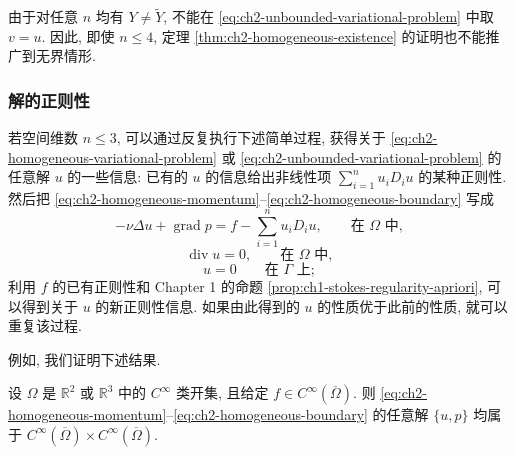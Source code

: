 \begin{Remark}
\label{rem:ch2-unbounded-test-space}
由于对任意 $n$ 均有 $Y\neq\widetilde Y$, 不能在 \eqref{eq:ch2-unbounded-variational-problem} 中取 $v=u$. 因此, 即使 $n\leq4$, 定理 \ref{thm:ch2-homogeneous-existence} 的证明也不能推广到无界情形.
\end{Remark}

\subsubsection*{解的正则性}

若空间维数 $n\leq3$, 可以通过反复执行下述简单过程, 获得关于 \eqref{eq:ch2-homogeneous-variational-problem} 或 \eqref{eq:ch2-unbounded-variational-problem} 的任意解 $u$ 的一些信息: 已有的 $u$ 的信息给出非线性项 $\sum_{i=1}^n u_iD_i u$ 的某种正则性. 然后把 \eqref{eq:ch2-homogeneous-momentum}--\eqref{eq:ch2-homogeneous-boundary} 写成
\begin{equation}
-\nu\Delta u+\operatorname{grad}p
=f-\sum_{i=1}^{n}u_iD_i u,
\qquad\text{在 }\Omega\text{ 中},
\label{eq:ch2-regularity-momentum}
\end{equation}
\begin{equation}
\operatorname{div}u=0,
\qquad\text{在 }\Omega\text{ 中},
\label{eq:ch2-regularity-incompressibility}
\end{equation}
\begin{equation}
u=0\qquad\text{在 }\Gamma\text{ 上};
\label{eq:ch2-regularity-boundary}
\end{equation}
利用 $f$ 的已有正则性和 Chapter 1 的命题 \ref{prop:ch1-stokes-regularity-apriori}, 可以得到关于 $u$ 的新正则性信息. 如果由此得到的 $u$ 的性质优于此前的性质, 就可以重复该过程.

例如, 我们证明下述结果.

\begin{Proposition}
\label{prop:ch2-smoothness-of-solution}
设 $\Omega$ 是 $\mathbb R^2$ 或 $\mathbb R^3$ 中的 $C^\infty$ 类开集, 且给定 $f\in C^\infty(\overline\Omega)$. 则 \eqref{eq:ch2-homogeneous-momentum}--\eqref{eq:ch2-homogeneous-boundary} 的任意解 $\{u,p\}$ 均属于 $C^\infty(\overline\Omega)\times C^\infty(\overline\Omega)$.
\end{Proposition}

